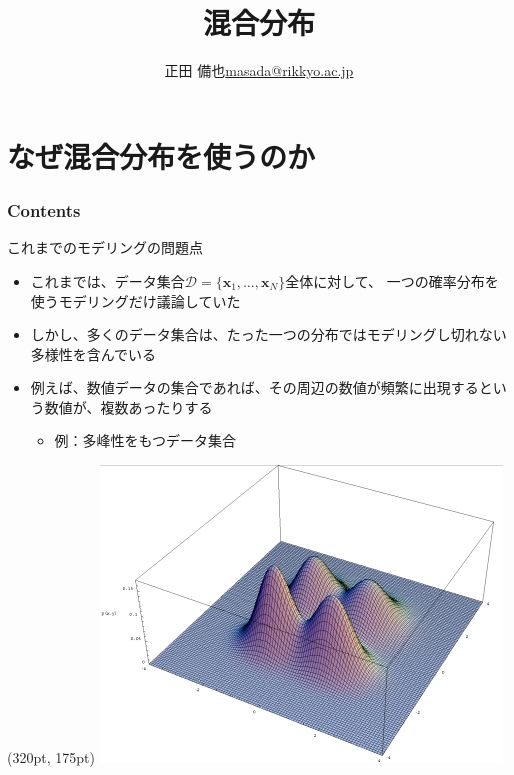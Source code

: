 \documentclass[aspectratio=169,unicode,dvipdfmx,14pt]{beamer}
\title{ \\混合分布}
\author{\texorpdfstring{正田 備也\newline\href{mailto:masada@rikkyo.ac.jp}{masada@rikkyo.ac.jp}}{正田 備也}}
\date{}
\begin{document}
\begin{frame}
\titlepage
\end{frame}

\section{なぜ混合分布を使うのか}

\begin{frame}\frametitle{Contents}
\Large \tableofcontents[currentsection]
\end{frame}

\begin{frame}{これまでのモデリングの問題点}
\begin{itemize}
\item これまでは、データ集合$\mathcal{D}=\{\bm{x}_1, \ldots, \bm{x}_N\}$全体に対して、
一つの確率分布を使うモデリングだけ議論していた
\item しかし、多くのデータ集合は、たった一つの分布ではモデリングし切れない多様性を含んでいる
\item 例えば、数値データの集合であれば、その周辺の数値が頻繁に出現するという数値が、複数あったりする
\begin{itemize}
\item 例：多峰性をもつデータ集合
\end{itemize}
\end{itemize}
\begin{textblock*}{0.4\linewidth}(320pt, 175pt)
    \centering
    \includegraphics[width=0.7\linewidth]{Bimodal-bivariate-small.png}
\end{textblock*}

\end{frame}
\end{document}
